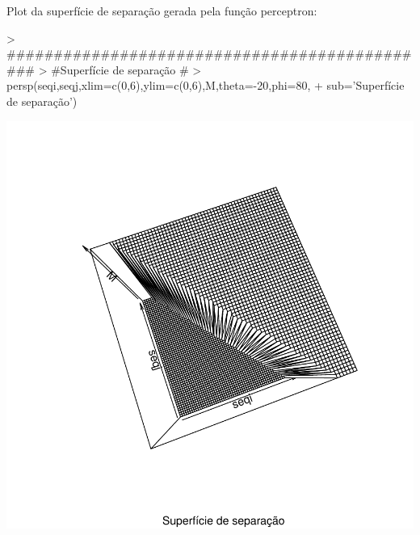 \documentclass{article}
\begin{document}
Plot da superfície de separação gerada pela função perceptron:
\begin{Schunk}
\begin{Sinput}
> ##############################################
> #Superfície de separação #
> persp(seqi,seqj,xlim=c(0,6),ylim=c(0,6),M,theta=-20,phi=80,
+       sub='Superfície de separação')
\end{Sinput}
\end{Schunk}
\includegraphics{perceptron-006}
\end{document}
